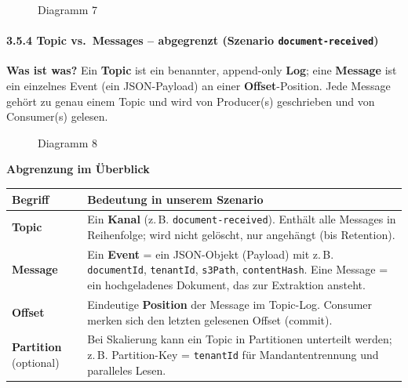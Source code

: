 \begin{figure}
\centering
\pandocbounded{}
\caption{Diagramm 7}
\end{figure}

\paragraph{\texorpdfstring{3.5.4 Topic vs.~Messages -- abgegrenzt
(Szenario
\texttt{document-received})}{3.5.4 Topic vs.~Messages -- abgegrenzt (Szenario document-received)}}\label{topic-vs.-messages-abgegrenzt-szenario-document-received}

\textbf{Was ist was?} Ein \textbf{Topic} ist ein benannter, append-only
\textbf{Log}; eine \textbf{Message} ist ein einzelnes Event (ein
JSON-Payload) an einer \textbf{Offset}-Position. Jede Message gehört zu
genau einem Topic und wird von Producer(s) geschrieben und von
Consumer(s) gelesen.

\begin{figure}
\centering
\pandocbounded{}
\caption{Diagramm 8}
\end{figure}

\textbf{Abgrenzung im Überblick}

{\def\LTcaptype{none} %
\begin{longtable}[]{@{}
  >{\raggedright\arraybackslash}p{}
  >{\raggedright\arraybackslash}p{}@{}}
\toprule\noalign{}
\begin{minipage}[b]{\linewidth}\raggedright
Begriff
\end{minipage} & \begin{minipage}[b]{\linewidth}\raggedright
Bedeutung in unserem Szenario
\end{minipage} \\
\midrule\noalign{}
\endhead
\bottomrule\noalign{}
\endlastfoot
\textbf{Topic} & Ein \textbf{Kanal} (z.\,B. \texttt{document-received}).
Enthält alle Messages in Reihenfolge; wird nicht gelöscht, nur angehängt
(bis Retention). \\
\textbf{Message} & Ein \textbf{Event} = ein JSON-Objekt (Payload) mit
z.\,B. \texttt{documentId}, \texttt{tenantId}, \texttt{s3Path},
\texttt{contentHash}. Eine Message = ein hochgeladenes Dokument, das zur
Extraktion ansteht. \\
\textbf{Offset} & Eindeutige \textbf{Position} der Message im Topic-Log.
Consumer merken sich den letzten gelesenen Offset (commit). \\
\textbf{Partition} (optional) & Bei Skalierung kann ein Topic in
Partitionen unterteilt werden; z.\,B. Partition-Key = \texttt{tenantId}
für Mandantentrennung und paralleles Lesen. \\
\end{longtable}
}

